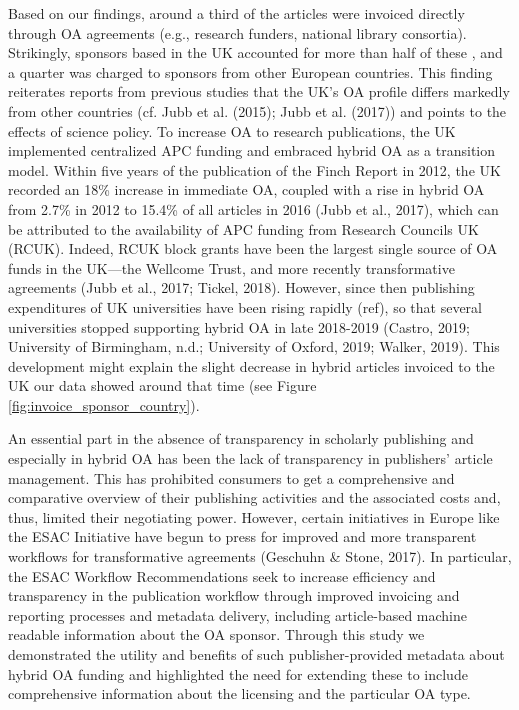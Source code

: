 \documentclass[a4paper,man,floatsintext,longtable,noextraspace,12pt]{apa6}
\begin{document}
Based on our findings, around a third of the articles were invoiced
directly through OA agreements (e.g., research funders, national library
consortia). Strikingly, sponsors based in the UK accounted for more than
half of these , and a quarter was charged to sponsors from other
European countries. This finding reiterates reports from previous
studies that the UK's OA profile differs markedly from other countries
(cf. Jubb et al. (2015); Jubb et al. (2017)) and points to the effects
of science policy. To increase OA to research publications, the UK
implemented centralized APC funding and embraced hybrid OA as a
transition model. Within five years of the publication of the Finch
Report in 2012, the UK recorded an 18\% increase in immediate OA,
coupled with a rise in hybrid OA from 2.7\% in 2012 to 15.4\% of all
articles in 2016 (Jubb et al., 2017), which can be attributed to the
availability of APC funding from Research Councils UK (RCUK). Indeed,
RCUK block grants have been the largest single source of OA funds in the
UK---the Wellcome Trust, and more recently transformative agreements
(Jubb et al., 2017; Tickel, 2018). However, since then publishing
expenditures of UK universities have been rising rapidly (ref), so that
several universities stopped supporting hybrid OA in late 2018-2019
(Castro, 2019; University of Birmingham, n.d.; University of Oxford,
2019; Walker, 2019). This development might explain the slight decrease
in hybrid articles invoiced to the UK our data showed around that time
(see Figure \ref{fig:invoice_sponsor_country}).

An essential part in the absence of transparency in scholarly publishing
and especially in hybrid OA has been the lack of transparency in
publishers' article management. This has prohibited consumers to get a
comprehensive and comparative overview of their publishing activities
and the associated costs and, thus, limited their negotiating power.
However, certain initiatives in Europe like the ESAC Initiative have
begun to press for improved and more transparent workflows for
transformative agreements (Geschuhn \& Stone, 2017). In particular, the
ESAC Workflow Recommendations seek to increase efficiency and
transparency in the publication workflow through improved invoicing and
reporting processes and metadata delivery, including article-based
machine readable information about the OA sponsor. Through this study we
demonstrated the utility and benefits of such publisher-provided
metadata about hybrid OA funding and highlighted the need for extending
these to include comprehensive information about the licensing and the
particular OA type.
\end{document}
